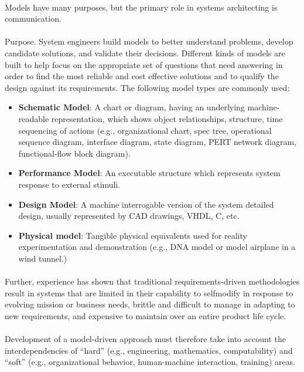 \documentclass[a4paper,12pt,twoside]{report}
\begin{document}
			\paragraph{} {Models have many purposes, but the primary role in systems architecting is communication. \cite{MBSESystemArchitectureNavalShipDesign}
			}
			
			\paragraph{} {Purpose. System engineers build models to better understand problems, develop candidate solutions, and validate their decisions. Different kinds of models are built to help focus on the appropriate set of questions that need answering in order to find the most reliable and cost effective solutions and to qualify the design against its requirements. The following model types are commonly used:
				\begin{itemize}
					\item \textbf{Schematic Model}: A chart or diagram, having an underlying machine-readable representation, which shows object relationships, structure, time sequencing of actions (e.g., organizational chart, spec tree, operational sequence diagram, interface diagram, state diagram, PERT network diagram, functional-flow block diagram).
					\item \textbf{Performance Model}: An executable structure which represents system response to external stimuli.
					\item \textbf{Design Model}: A machine interrogable version of the system detailed design, usually represented by CAD drawings, VHDL, C, etc.
					\item  \textbf{Physical model}: Tangible physical equivalents used for reality experimentation and demonstration (e.g., DNA model or model airplane in a wind tunnel.)
				\end{itemize}
			}
			\paragraph{}{Further, experience has shown that traditional requirements-driven methodologies result in systems that are limited in their capability to selfmodify in response to evolving mission or business needs, brittle and difficult to manage in adapting to new requirements, and expensive to maintain over an entire product life cycle.
			}
			
			\paragraph{} {Development of a model-driven approach must therefore take into account the interdependencies of “hard” (e.g., engineering, mathematics, computability) and “soft” (e.g., organizational behavior, human-machine interaction, training) areas. \cite{FoundationalConceptsMDSD}
			}
			
\end{document}
